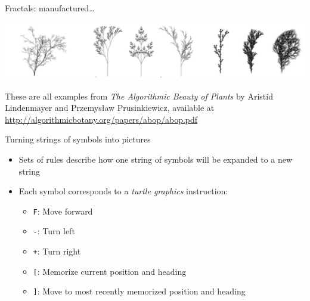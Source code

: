 \documentclass[bigger]{beamer}
\begin{document}
\begin{frame}[label={sec:org3e00b6f}]{Fractals: manufactured\ldots{}}
\begin{center}
\includegraphics[width=.9\linewidth]{./agop.jpg}
\end{center}

These are all examples from \emph{The Algorithmic Beauty of Plants} by 
Aristid Lindenmayer and Przemysław Prusinkiewicz, available at 
\url{http://algorithmicbotany.org/papers/abop/abop.pdf}
\end{frame}

\begin{frame}[fragile,label={sec:orgc162eb6}]{Turning strings of symbols into pictures}
 \begin{itemize}
\item Sets of rules describe how one string of symbols will be expanded to a new string
\item Each symbol corresponds to a \emph{turtle graphics} instruction:

\begin{itemize}
\item \texttt{F}: Move forward
\item \texttt{-}: Turn left
\item \texttt{+}: Turn right
\item \texttt{[}: Memorize current position and heading
\item \texttt{]}: Move to most recently memorized position and heading
\end{itemize}
\end{itemize}
\end{frame}
\end{document}
